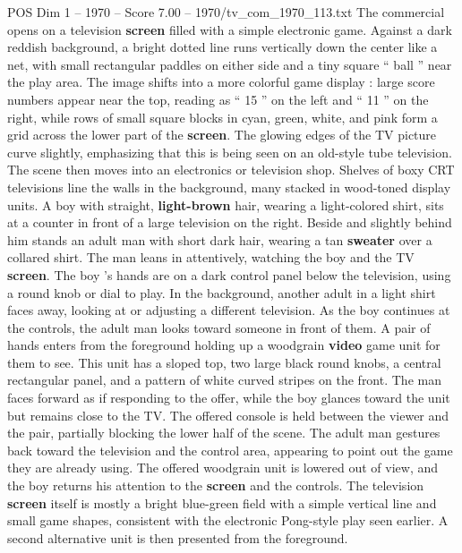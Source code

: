 \begin{textsample}{POS Dim 1 – 1970 – Score 7.00 – 1970/tv\_com\_1970\_113.txt}  \label{ex:f1_pos_063}
The commercial opens on a television \textbf{screen} filled with a simple electronic game.
Against a dark reddish background, a bright dotted line runs vertically down the center like a net, with small rectangular paddles on either side and a tiny square “ ball ” near the play area.
The image shifts into a more colorful game display : large score numbers appear near the top, reading as “ 15 ” on the left and “ 11 ” on the right, while rows of small square blocks in cyan, green, white, and pink form a grid across the lower part of the \textbf{screen}.
The glowing edges of the TV picture curve slightly, emphasizing that this is being seen on an old-style tube television.
The scene then moves into an electronics or television shop.
Shelves of boxy CRT televisions line the walls in the background, many stacked in wood-toned display units.
A boy with straight, \textbf{light-brown} hair, wearing a light-colored shirt, sits at a counter in front of a large television on the right.
Beside and slightly behind him stands an adult man with short dark hair, wearing a tan \textbf{sweater} over a collared shirt.
The man leans in attentively, watching the boy and the TV \textbf{screen}.
The boy ’s hands are on a dark control panel below the television, using a round knob or dial to play.
In the background, another adult in a light shirt faces away, looking at or adjusting a different television.
As the boy continues at the controls, the adult man looks toward someone in front of them.
A pair of hands enters from the foreground holding up a woodgrain \textbf{video} game unit for them to see.
This unit has a sloped top, two large black round knobs, a central rectangular panel, and a pattern of white curved stripes on the front.
The man faces forward as if responding to the offer, while the boy glances toward the unit but remains close to the TV.
The offered console is held between the viewer and the pair, partially blocking the lower half of the scene.
The adult man gestures back toward the television and the control area, appearing to point out the game they are already using.
The offered woodgrain unit is lowered out of view, and the boy returns his attention to the \textbf{screen} and the controls.
The television \textbf{screen} itself is mostly a bright blue-green field with a simple vertical line and small game shapes, consistent with the electronic Pong-style play seen earlier.
A second alternative unit is then presented from the foreground.

\end{textsample}
